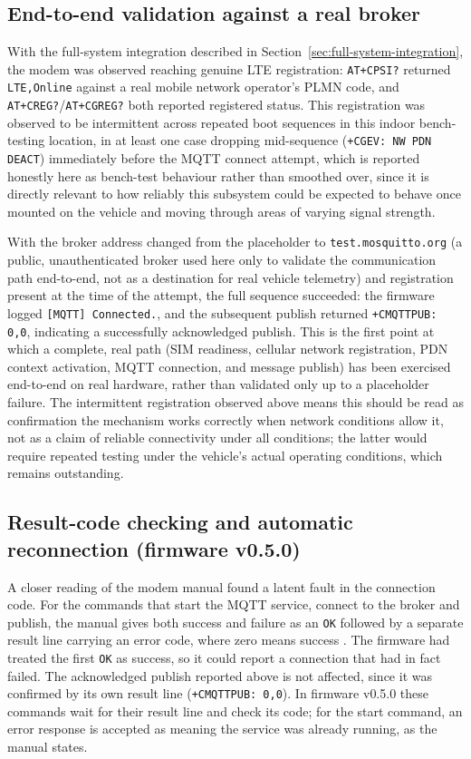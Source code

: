 \subsection{End-to-end validation against a real broker}

With the full-system integration described in Section~\ref{sec:full-system-integration}, the modem was observed reaching genuine LTE registration: \texttt{AT+CPSI?} returned \texttt{LTE,Online} against a real mobile network operator's PLMN code, and \texttt{AT+CREG?}/\texttt{AT+CGREG?} both reported registered status. This registration was observed to be intermittent across repeated boot sequences in this indoor bench-testing location, in at least one case dropping mid-sequence (\texttt{+CGEV: NW PDN DEACT}) immediately before the MQTT connect attempt, which is reported honestly here as bench-test behaviour rather than smoothed over, since it is directly relevant to how reliably this subsystem could be expected to behave once mounted on the vehicle and moving through areas of varying signal strength.

With the broker address changed from the placeholder to \texttt{test.mosquitto.org} (a public, unauthenticated broker used here only to validate the communication path end-to-end, not as a destination for real vehicle telemetry) and registration present at the time of the attempt, the full sequence succeeded: the firmware logged \texttt{[MQTT] Connected.}, and the subsequent publish returned \texttt{+CMQTTPUB: 0,0}, indicating a successfully acknowledged publish. This is the first point at which a complete, real path (SIM readiness, cellular network registration, PDN context activation, MQTT connection, and message publish) has been exercised end-to-end on real hardware, rather than validated only up to a placeholder failure. The intermittent registration observed above means this should be read as confirmation the mechanism works correctly when network conditions allow it, not as a claim of reliable connectivity under all conditions; the latter would require repeated testing under the vehicle's actual operating conditions, which remains outstanding.

\subsection{Result-code checking and automatic reconnection (firmware v0.5.0)}

A closer reading of the modem manual found a latent fault in the connection code. For the commands that start the MQTT service, connect to the broker and publish, the manual gives both success and failure as an \texttt{OK} followed by a separate result line carrying an error code, where zero means success \cite{simcoma76xx}. The firmware had treated the first \texttt{OK} as success, so it could report a connection that had in fact failed. The acknowledged publish reported above is not affected, since it was confirmed by its own result line (\texttt{+CMQTTPUB: 0,0}). In firmware v0.5.0 these commands wait for their result line and check its code; for the start command, an error response is accepted as meaning the service was already running, as the manual states.

